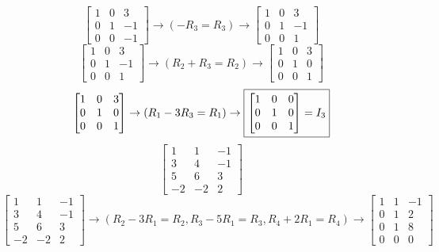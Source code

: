 \documentclass[letterpaper]{report}
\begin{document}
\[
\begin{bmatrix} 
    1 & 0 & 3 \\
    0 & 1 & -1 \\
    0 & 0 & -1
\end{bmatrix} \to (-R_3 = R_3) \to 
\begin{bmatrix} 
    1 & 0 & 3 \\
    0 & 1 & -1 \\
    0 & 0 & 1
\end{bmatrix} 
\] 
\[
\begin{bmatrix} 
    1 & 0 & 3 \\
    0 & 1 & -1 \\
    0 & 0 & 1
\end{bmatrix} \to (R_2 + R_3 = R_2) \to 
\begin{bmatrix} 
    1 & 0 & 3 \\
    0 & 1 & 0 \\
    0 & 0 & 1
\end{bmatrix} 
\] 
\[
\begin{bmatrix} 
    1 & 0 & 3 \\
    0 & 1 & 0 \\
    0 & 0 & 1
\end{bmatrix} \to 
(R_1 - 3R_3 = R_1) \to
\fbox{$
\begin{bmatrix} 
    1 & 0 & 0 \\
    0 & 1 & 0 \\
    0 & 0 & 1
\end{bmatrix} = I_3 $}
\] 
\noindent\makebox[\linewidth]{\rule{\linewidth}{0.4pt}}
    \[
    \begin{bmatrix} 
        1 & 1 & -1 \\
        3 & 4 & -1 \\
        5 & 6 & 3 \\
        -2 & -2 & 2
    \end{bmatrix} 
    \] 
\[
\begin{bmatrix} 
        1 & 1 & -1 \\
        3 & 4 & -1 \\
        5 & 6 & 3 \\
        -2 & -2 & 2
    \end{bmatrix}
\to (R_2 - 3R_1 = R_2, R_3 - 5R_1 = R_3, R_4 + 2R_1 = R_4) \to 
\begin{bmatrix} 
    1 & 1 & -1 \\
    0 & 1 & 2 \\
    0 & 1 & 8 \\
    0 & 0 & 0 
\end{bmatrix} 
\]
\end{document}

